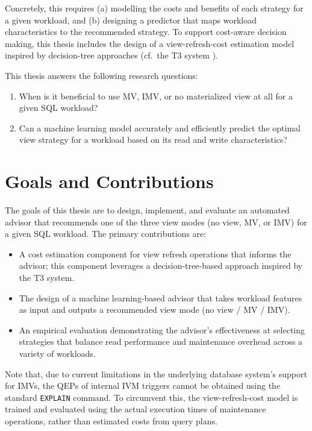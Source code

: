Concretely, this requires (a) modelling the costs and benefits of each strategy for a given workload, and (b) designing a predictor that maps workload characteristics to the recommended strategy. To support cost-aware decision making, this thesis includes the design of a view-refresh-cost estimation model inspired by decision-tree approaches (cf.\ the T3 system \cite{rieger2025t3}).

This thesis answers the following research questions:

\begin{enumerate}
    \item When is it beneficial to use \ac{MV}, \ac{IMV}, or no materialized view at all for a given SQL workload?
    \item Can a machine learning model accurately and efficiently predict the optimal view strategy for a workload based on its read and write characteristics?
\end{enumerate}

\section{Goals and Contributions}
\label{sec:goals}
The goals of this thesis are to design, implement, and evaluate an automated advisor that recommends one of the three view modes (no view, \ac{MV}, or \ac{IMV}) for a given SQL workload. The primary contributions are:

\begin{itemize}
    \item A cost estimation component for view refresh operations that informs the advisor; this component leverages a decision-tree-based approach inspired by the T3 system\cite{rieger2025t3}.
    \item The design of a machine learning-based advisor that takes workload features as input and outputs a recommended view mode (no view / \ac{MV} / \ac{IMV}).
    \item An empirical evaluation demonstrating the advisor's effectiveness at selecting strategies that balance read performance and maintenance overhead across a variety of workloads.
\end{itemize}

Note that, due to current limitations in the underlying database system's support for \ac{IMV}s, the \ac{QEP}s of internal \ac{IVM} triggers cannot be obtained using the standard \texttt{EXPLAIN} command. To circumvent this, the view-refresh-cost model is trained and evaluated using the actual execution times of maintenance operations, rather than estimated costs from query plans.

